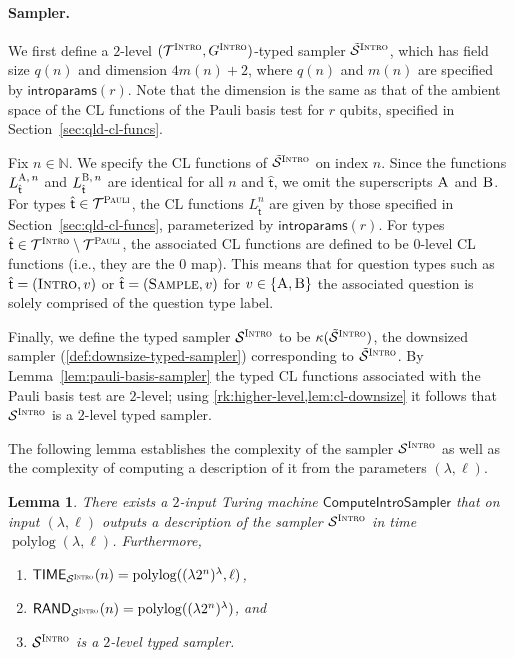 \documentclass[11pt]{article}
\newtheorem{lemma}[theorem]{Lemma}
\theoremstyle{definition}
\newcommand{\N}{\ensuremath{\mathbb{N}}}
\newcommand{\downsize}{\kappa}
\DeclareMathOperator{\polylog}{polylog}
\newcommand{\sampler}{\mathcal{S}}
\newcommand{\type}{\mathcal{T}}
\newcommand{\gamestyle}[1]{\ensuremath{\textsc{#1}}\xspace}
\newcommand{\pauli}{\gamestyle{Pauli}}
\newcommand{\intro}{\gamestyle{Intro}}
\newcommand{\labelstyle}[1]{\ensuremath{\textsc{#1}}\xspace}
\newcommand{\tvarstyle}[1]{\mathsf{#1}}
\newcommand{\tvar}{\ensuremath{\tvarstyle{t}}}
\newcommand{\trole}{\ensuremath{v}} %
\newcommand{\alice}{\labelstyle{A}}
\newcommand{\bob}{\labelstyle{B}}
\newcommand{\typestyle}[1]{\ensuremath{\textsc{#1}}\xspace}
\newcommand{\Sample}{\typestyle{Sample}}
\newcommand{\Introspect}{\typestyle{Intro}}
\newcommand{\introparams}{\mathsf{introparams}}
\newcommand{\TIME}{\mathsf{TIME}}
\newcommand{\RAND}{\mathsf{RAND}}
\newcommand{\tmstyle}[1]{\ensuremath{\mathsf{#1}}}
\newcommand{\ComputeIntroSampler}{\tmstyle{ComputeIntroSampler}}
\begin{document}
\paragraph{Sampler.}
We first define a $2$-level $(\type^\intro,G^\intro)$-typed sampler
$\tilde{\sampler}^\intro$, which has field size $q(n)$ and dimension $4m(n) +
2$, where $q(n)$ and $m(n)$ are specified by $\introparams(r)$.
Note that the dimension is the same as that of the ambient space of the CL
functions of the Pauli basis test for $r$ qubits, specified in Section~\ref{sec:qld-cl-funcs}.

Fix $n \in \N$.
We specify the CL functions of $\tilde{\sampler}^\intro$ on index $n$.
Since the functions $L_{\hat{\tvar}}^{\alice,\, n}$ and
$L_{\hat{\tvar}}^{\bob,\, n}$ are identical for all $n$ and $\hat{\tvar}$, we
omit the superscripts $\alice$ and $\bob$.
For types $\hat{\tvar} \in \type^\pauli$, the CL functions $L_{\hat{\tvar}}^n$
are given by those specified in Section~\ref{sec:qld-cl-funcs}, parameterized by
$\introparams(r)$.
For types $\hat{\tvar} \in \type^\intro \setminus \type^\pauli$, the associated
CL functions are defined to be $0$-level CL functions (i.e., they are the $0$
map).
This means that for question types such as $\hat{\tvar}=(\Introspect, \trole)$
or $\hat{\tvar}=(\Sample, \trole)$ for $\trole\in\{\alice,\bob\}$ the associated question is solely comprised
of the question type label.

Finally, we define the typed sampler $\sampler^\intro$ to be
$\downsize(\tilde{\sampler}^\intro)$, the downsized sampler
(\cref{def:downsize-typed-sampler}) corresponding to $\tilde{\sampler}^\intro$.
By Lemma~\ref{lem:pauli-basis-sampler} the typed CL functions associated with
the Pauli basis test are $2$-level; using \cref{rk:higher-level,lem:cl-downsize}
it follows that $\sampler^\intro$ is a $2$-level typed sampler.

The following lemma establishes the complexity of the sampler $\sampler^\intro$
as well as the complexity of computing a {description} of it from the parameters
$(\lambda,\ell)$.
\begin{lemma}
  \label{lem:intro-sampler-complexity}
  There exists a $2$-input Turing machine $\ComputeIntroSampler$ that
  on input $(\lambda,\ell)$ outputs a description of the sampler
  $\sampler^\intro$ in time $\polylog(\lambda,\ell)$.
  Furthermore, 
  \begin{enumerate}
  \item $\TIME_{\sampler^\intro}(n) = \polylog((\lambda 2^n)^\lambda, \ell)$,
	\item $\RAND_{\sampler^\intro}(n) = \polylog((\lambda 2^n)^\lambda)$, and 
	\item $\sampler^\intro$  is a $2$-level typed sampler.
  \end{enumerate}
\end{lemma}
\end{document}
